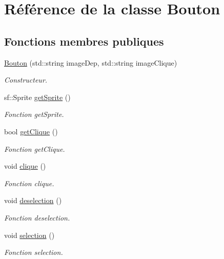 \hypertarget{classBouton}{\section{\-Référence de la classe \-Bouton}
\label{classBouton}
}
\subsection*{\-Fonctions membres publiques}
\begin{DoxyCompactItemize}
\item 
\hyperlink{classBouton_af319327a914b558a9ea993cbe1a68757}{\-Bouton} (std\-::string image\-Dep, std\-::string image\-Clique)
\begin{DoxyCompactList}\small\item\em \-Constructeur. \end{DoxyCompactList}\item 
sf\-::\-Sprite \hyperlink{classBouton_a58da4b13f14b4177d7959b912a1fc9bd}{get\-Sprite} ()
\begin{DoxyCompactList}\small\item\em \-Fonction get\-Sprite. \end{DoxyCompactList}\item 
\hypertarget{classBouton_ac0fa1f0c22d09299f9d0380b0e594e4d}{bool \hyperlink{classBouton_ac0fa1f0c22d09299f9d0380b0e594e4d}{get\-Clique} ()}\label{classBouton_ac0fa1f0c22d09299f9d0380b0e594e4d}

\begin{DoxyCompactList}\small\item\em \-Fonction get\-Clique. \end{DoxyCompactList}\item 
\hypertarget{classBouton_a7c7c9b6f21ca6346c61570612c1dc485}{void \hyperlink{classBouton_a7c7c9b6f21ca6346c61570612c1dc485}{clique} ()}\label{classBouton_a7c7c9b6f21ca6346c61570612c1dc485}

\begin{DoxyCompactList}\small\item\em \-Fonction clique. \end{DoxyCompactList}\item 
\hypertarget{classBouton_a71ecce6312b297811384722da8377d49}{void \hyperlink{classBouton_a71ecce6312b297811384722da8377d49}{deselection} ()}\label{classBouton_a71ecce6312b297811384722da8377d49}

\begin{DoxyCompactList}\small\item\em \-Fonction deselection. \end{DoxyCompactList}\item 
\hypertarget{classBouton_af9522cd8f1b62ba2df4a128c7dd68f65}{void \hyperlink{classBouton_af9522cd8f1b62ba2df4a128c7dd68f65}{selection} ()}\label{classBouton_af9522cd8f1b62ba2df4a128c7dd68f65}

\begin{DoxyCompactList}\small\item\em \-Fonction selection. \end{DoxyCompactList}\end{DoxyCompactItemize}


